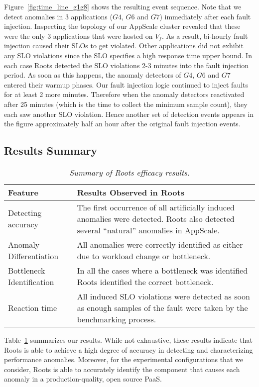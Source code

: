 Figure~\ref{fig:time_line_g1g8} shows the resulting event sequence. Note that we detect anomalies 
in 3 applications ($G4$, $G6$ and $G7$) immediately after each fault injection. Inspecting the 
topology of our AppScale cluster revealed that these were the only 3 applications that were 
hosted on $V_f$. As a result, bi-hourly fault injection caused their SLOs to
get violated. Other applications did not exhibit any SLO violations since 
the SLO specifies 
a high response time upper bound. In each case Roots detected the SLO violations 2-3 minutes into the fault injection
period. As soon as this happens, the anomaly detectors of $G4$, $G6$ and $G7$ entered their warmup phases.
Our fault injection logic continued to inject faults for at least 2 more minutes. 
Therefore when the anomaly detectors
reactivated after 25 minutes (which is the time to collect the minimum sample count), they each saw another SLO
violation. Hence another set of detection events appears in the figure
approximately half an hour after the
original fault injection events.

\subsection{Results Summary}

\begin{table}
{\footnotesize
\begin{center}
\begin{tabular}{|p{2cm}|p{6cm}|}
\hline
Feature & Results Observed in Roots \\ \hline
Detecting accuracy &
The first occurrence of all artificially induced anomalies were detected.
Roots also detected several ``natural'' anomalies in AppScale. \\ \hline
Anomaly Differentiation &
All anomalies were correctly identified as either due to workload change or
bottleneck. \\ \hline
Bottleneck Identification &
In all the cases where a bottleneck was identified Roots identified the
correct bottleneck. \\ \hline
Reaction time &
All induced SLO violations were detected as soon
as enough samples of the fault
were taken by the benchmarking process. \\
\hline
\end{tabular}
\end{center}
}
\caption{\textit{Summary of Roots efficacy results.
\label{tab:results_summary}
}}
\vspace{-0.2in}
\end{table}
Table~\ref{tab:results_summary} summarizes our results.
While not exhaustive, these results indicate that Roots is able to achieve a
high degree of accuracy in detecting and characterizing performance anomalies.
Moreover, for the experimental configurations that we consider, Roots is able to accurately identify
the component that causes each anomaly in a production-quality, open source PaaS.

